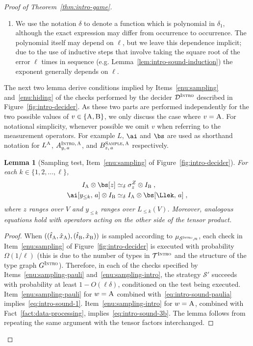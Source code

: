 \documentclass[11pt]{article}
\newtheorem{lemma}[theorem]{Lemma}
\theoremstyle{definition}
\newcommand{\Id}{\ensuremath{I}}
\newcommand{\ia}{\Id_\alice}
\newcommand{\ib}{\Id_\bob}
\newcommand{\sampler}{\mathcal{S}}
\newcommand{\decider}{\mathcal{D}}
\newcommand{\strategy}{\mathscr{S}}
\newcommand{\type}{\mathcal{T}}
\newcommand{\gamestyle}[1]{\ensuremath{\textsc{#1}}\xspace}
\newcommand{\intro}{\gamestyle{Intro}}
\newcommand{\labelstyle}[1]{\ensuremath{\textsc{#1}}\xspace}
\newcommand{\trole}{\ensuremath{v}} %
\newcommand{\alice}{\labelstyle{A}}
\newcommand{\bob}{\labelstyle{B}}
\newcommand{\typestyle}[1]{\ensuremath{\textsc{#1}}\xspace}
\newcommand{\Sample}{\typestyle{Sample}}
\newcommand{\Intro}{\typestyle{Intro}}
\begin{document}
\begin{proof}[Proof of Theorem~\ref{thm:intro-game}]
\begin{enumerate}
  \item We use the notation $\delta$ to denote a function which is polynomial in
    $\delta_1$, although the exact expression may differ from occurrence to
    occurrence.
    The polynomial itself may depend on $\ell$, but we leave this dependence
    implicit; due to the use of inductive steps that involve taking the square
    root of the error $\ell$ times in sequence (e.g.
    Lemma~\ref{lem:intro-sound-induction}) the exponent generally depends on
    $\ell$.
  \end{enumerate}

  The next two lemma derive conditions implied by Items~\ref{enu:sampling}
  and~\ref{enu:hiding} of the checks performed by the decider $\decider^\intro$
  described in Figure~\ref{fig:intro-decider}.
  As these two parts are performed independently for the two possible values of
  $\trole\in\{\alice,\bob\}$, we only discuss the case where $\trole = \alice$.
  For notational simplicity, whenever possible we omit $v$ when referring to the
  measurement operators.
  For example $L$, $\ai$ and $\bs$ are used as shorthand notation
  for $L^\alice$, $A^{\Intro,\, \alice}_{y,\, a}$, and $B^{\Sample,\,
    \alice}_{z,\, a}$ respectively.

  \begin{lemma}[Sampling test, Item~\ref{enu:sampling} of
    Figure~\ref{fig:intro-decider}]
    \label{lem:intro-sound-1}
    For each $k\in\{ 1, 2, \ldots, \ell\}$,
    \begin{align}
      \ia \otimes \bs[z]
      & \simeq_\delta \sigma^Z_z \otimes \ib\;,
        \label{eq:intro-sound-1} \\
      \ai[y_{\leq k},\, a] \otimes \ib
      & \simeq_\delta \ia \otimes \bs[\Llek,\, a]\;,
        \label{eq:intro-sound-3b}
    \end{align}
    where $z$ ranges over $V$ and $y_{\leq k}$ ranges over $L_{\leq k}(V)$.
    Moreover, analogous equations hold with operators acting on the other side
    of the tensor product.
  \end{lemma}
	
  \begin{proof}
    When $((\hat{t}_\alice,\hat{x}_\alice),(\hat{t}_\bob,\hat{x}_\bob))$ is
    sampled according to $\mu_{\sampler^\intro,n}$, each check in
    Item~\ref{enu:sampling} of Figure~\ref{fig:intro-decider} is executed with
    probability $\Omega(1/\ell)$ (this is due to the number of types in
    $\type^\intro$ and the structure of the type graph $G^\intro$).
    Therefore, in each of the checks specified by Items~\ref{enu:sampling-pauli}
    and~\ref{enu:sampling-intro}, the strategy $\strategy'$ succeeds with
    probability at least $1 - O(\ell \delta)$, conditioned on the test being
    executed.
    Item~\ref{enu:sampling-pauli} for $w=\alice$ combined
    with~\eqref{eq:intro-sound-paulia} implies~\eqref{eq:intro-sound-1}.
    Item~\ref{enu:sampling-intro} for $w=\alice$, combined with
    Fact~\ref{fact:data-processing}, implies~\eqref{eq:intro-sound-3b}.
    The lemma follows from repeating the same argument with the tensor factors
    interchanged.
  \end{proof}


\end{proof}
\end{document}
